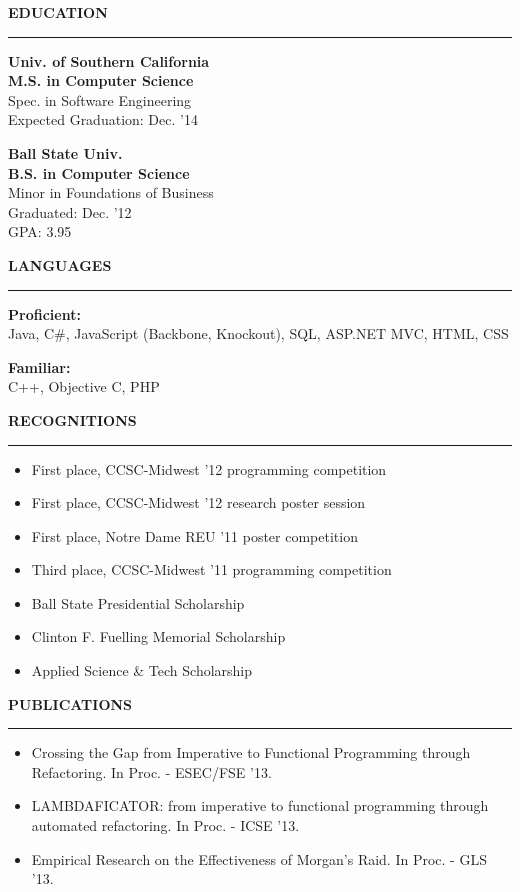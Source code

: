 \documentclass[a4paper,10pt]{article}
\newcommand{\header}[1]
{
{\Large \textbf {\uppercase{#1}}}
\vspace{0.05in}
\hrule
\vspace{0.15in}
}
\newcommand{\spacer}{\vspace*{1\baselineskip}}
\newenvironment{details}
{\begin{itemize}[label=\scalebox{.5}{\ding{117}},leftmargin=0.15in]}
{\end{itemize}}
\begin{document}
\begin{minipage}[t]{0.35\textwidth}
\header{Education}

\textbf{Univ. of Southern California\\
M.S. in Computer Science\\}
Spec. in Software Engineering\\
Expected Graduation: Dec. '14
\spacer

\textbf{Ball State Univ.\\
B.S. in Computer Science\\}
Minor in Foundations of Business\\
Graduated: Dec. '12\\
GPA: 3.95

\spacer

\header{Languages}

\textbf{Proficient:}\\
Java, C\#, JavaScript (Backbone, Knockout), SQL, ASP.NET MVC, HTML, CSS

\spacer

\textbf{Familiar:}\\
C++, Objective C, PHP

\spacer

\header{Recognitions}

\vspace{-0.1in}
\begin{details}
  \item First place, CCSC-Midwest '12 programming competition
  \item First place, CCSC-Midwest '12 research poster session
  \item First place, Notre Dame REU '11 poster competition
  \item Third place, CCSC-Midwest '11 programming competition
  \item Ball State Presidential Scholarship
  \item Clinton F. Fuelling Memorial Scholarship
  \item Applied Science \& Tech Scholarship
\end{details}
\vspace{-0.1in}

\spacer

\header{Publications}

\vspace{-0.1in}
\begin{details}
  \item
  Crossing the Gap from Imperative to Functional Programming through Refactoring.
  In Proc. - ESEC/FSE '13.
  
  \item 
  LAMBDAFICATOR: from imperative to functional programming through automated refactoring. 
  In Proc. - ICSE '13.
  
  \item
  Empirical Research on the Effectiveness of Morgan's Raid.
  In Proc. - GLS '13.
\end{details}
\vspace{-0.1in}

\end{minipage}
\end{document}
